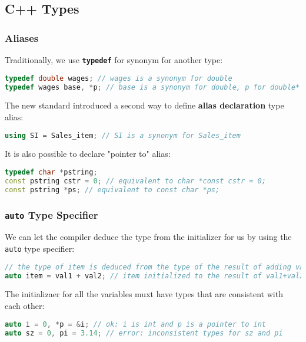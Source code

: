 \subsection{C++ Types}
\label{task:20231122_cpp}

\subsubsection{Aliases}

Traditionally, we use \textbf{\texttt{typedef}} for synonym for another type:
\begin{lstlisting}[language=C++]
typedef double wages; // wages is a synonym for double 
typedef wages base, *p; // base is a synonym for double, p for double*
\end{lstlisting}


The new standard introduced a second way to define \textbf{alias declaration} type alias:
\begin{lstlisting}[language=C++]
using SI = Sales_item; // SI is a synonym for Sales_item
\end{lstlisting}

It is also possible to declare "pointer to" alias:
\begin{lstlisting}[language=C++]
typedef char *pstring; 
const pstring cstr = 0; // equivalent to char *const cstr = 0; 
const pstring *ps; // equivalent to const char *ps;
\end{lstlisting}

\subsubsection{\texttt{auto} Type Specifier}

We can let the compiler deduce the type from the initializer for us by using the \texttt{auto} type specifier:
\begin{lstlisting}[language=C++]
// the type of item is deduced from the type of the result of adding val1 and val2 
auto item = val1 + val2; // item initialized to the result of val1+val2
\end{lstlisting}

The initializaer for all the variables muxt have types that are consistent with each other:
\begin{lstlisting}[language=C++]
auto i = 0, *p = &i; // ok: i is int and p is a pointer to int 
auto sz = 0, pi = 3.14; // error: inconsistent types for sz and pi
\end{lstlisting}

